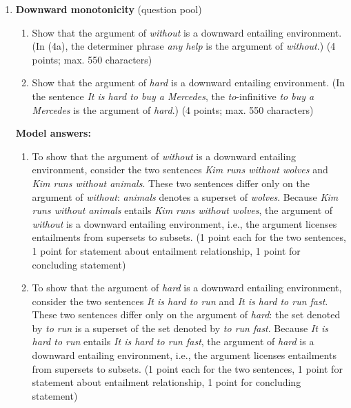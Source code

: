 \documentclass[a4,11pt]{article}
\begin{document}
\begin{enumerate}[leftmargin = 12pt]
\item {\bf Downward monotonicity} (question pool)

\begin{enumerate}[noitemsep]

\item Show that the argument of \textit{without} is a downward entailing environment. (In (4a), the determiner phrase \textit{any help} is the argument of \textit{without}.) (4 points; max. 550 characters)

\item Show that the argument of \textit{hard} is a downward entailing environment. (In the sentence \textit{It is hard to buy a Mercedes}, the \textit{to}-infinitive \textit{to buy a Mercedes} is the argument of \textit{hard}.) (4 points; max. 550 characters)

\end{enumerate}

{\bf Model answers:} 

\begin{enumerate}[noitemsep]

\item To show that the argument of \textit{without} is a downward entailing environment, consider the two sentences \textit{Kim runs without wolves} and \textit{Kim runs without animals}. These two sentences differ only on the argument of {\em without}: {\em animals} denotes a superset of {\em wolves}. Because \textit{Kim runs without animals} entails \textit{Kim runs without wolves}, the argument of \textit{without} is a downward entailing environment, i.e., the argument licenses entailments from supersets to subsets.  (1 point each for the two sentences, 1 point for statement about entailment relationship, 1 point for concluding statement)

\item To show that the argument of \textit{hard} is a downward entailing environment, consider the two sentences {\em It is hard to run} and {\em It is hard to run fast}. These two sentences differ only on the argument of {\em hard}: the set denoted by {\em to run} is a superset of the set denoted by {\em to run fast}. Because {\em It is hard to run} entails {\em It is hard to run fast}, the argument of {\em hard} is a downward entailing environment, i.e., the argument licenses entailments from supersets to subsets. (1 point each for the two sentences, 1 point for statement about entailment relationship, 1 point for concluding statement)

\end{enumerate}


\end{enumerate}
\end{document}

